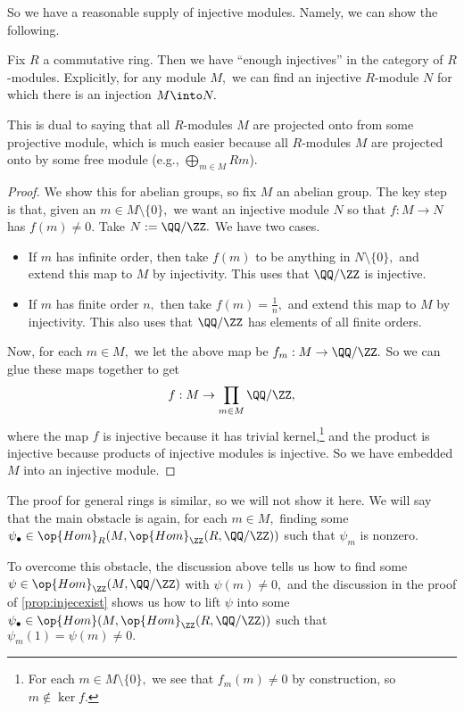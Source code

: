 So we have a reasonable supply of injective modules. Namely, we can show the following.
\begin{proposition}
	Fix $R$ a commutative ring. Then we have ``enough injectives'' in the category of $R$-modules. Explicitly, for any module $M,$ we can find an injective $R$-module $N$ for which there is an injection $M\into N.$
\end{proposition}
\begin{remark}
	This is dual to saying that all $R$-modules $M$ are projected onto from some projective module, which is much easier because all $R$-modules $M$ are projected onto by some free module (e.g., $\bigoplus_{m\in M}Rm$).
\end{remark}
\begin{proof}
	We show this for abelian groups, so fix $M$ an abelian group. The key step is that, given an $m\in M\setminus\{0\},$ we want an injective module $N$ so that $f:M\to N$ has $f(m)\ne0.$ Take $N:=\QQ/\ZZ.$ We have two cases.
	\begin{itemize}
		\item If $m$ has infinite order, then take $f(m)$ to be anything in $N\setminus\{0\},$ and extend this map to $M$ by injectivity. This uses that $\QQ/\ZZ$ is injective.
		\item If $m$ has finite order $n,$ then take $f(m)=\frac1n,$ and extend this map to $M$ by injectivity. This also uses that $\QQ/\ZZ$ has elements of all finite orders.
	\end{itemize}
	Now, for each $m\in M,$ we let the above map be $f_m:M\to\QQ/\ZZ.$ So we can glue these maps together to get
	\[f:M\to\prod_{m\in M}\QQ/\ZZ,\]
	where the map $f$ is injective because it has trivial kernel,\footnote{For each $m\in M\setminus\{0\},$ we see that $f_m(m)\ne0$ by construction, so $m\notin\ker f.$} and the product is injective because products of injective modules is injective. So we have embedded $M$ into an injective module.
\end{proof}
The proof for general rings is similar, so we will not show it here. We will say that the main obstacle is again, for each $m\in M,$ finding some $\psi_\bullet\in\op{Hom}_R(M,\op{Hom}_\ZZ(R,\QQ/\ZZ))$ such that $\psi_m$ is nonzero.

To overcome this obstacle, the discussion above tells us how to find some $\psi\in\op{Hom}_\ZZ(M,\QQ/\ZZ)$ with $\psi(m)\ne0,$ and the discussion in the proof of \autoref{prop:injecexist} shows us how to lift $\psi$ into some $\psi_\bullet\in\op{Hom}(M,\op{Hom}_\ZZ(R,\QQ/\ZZ))$ such that $\psi_m(1)=\psi(m)\ne0.$

